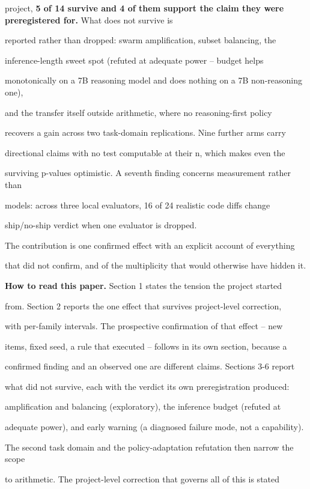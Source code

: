 \documentclass[11pt]{article}
\begin{document}
project, {\bf 5 of 14 survive and 4 of them support the claim they were preregistered for.} What does not survive is

reported rather than dropped: swarm amplification, subset balancing, the

inference-length sweet spot (refuted at adequate power -- budget helps

monotonically on a 7B reasoning model and does nothing on a 7B non-reasoning one),

and the transfer itself outside arithmetic, where no reasoning-first policy

recovers a gain across two task-domain replications. Nine further arms carry

directional claims with no test computable at their n, which makes even the

surviving p-values optimistic. A seventh finding concerns measurement rather than

models: across three local evaluators, 16 of 24 realistic code diffs change

ship/no-ship verdict when one evaluator is dropped.


The contribution is one confirmed effect with an explicit account of everything

that did not confirm, and of the multiplicity that would otherwise have hidden it.


{\bf How to read this paper.} Section 1 states the tension the project started

from. Section 2 reports the one effect that survives project-level correction,

with per-family intervals. The prospective confirmation of that effect -- new

items, fixed seed, a rule that executed -- follows in its own section, because a

confirmed finding and an observed one are different claims. Sections 3-6 report

what did not survive, each with the verdict its own preregistration produced:

amplification and balancing (exploratory), the inference budget (refuted at

adequate power), and early warning (a diagnosed failure mode, not a capability).

The second task domain and the policy-adaptation refutation then narrow the scope

to arithmetic. The project-level correction that governs all of this is stated
\end{document}
